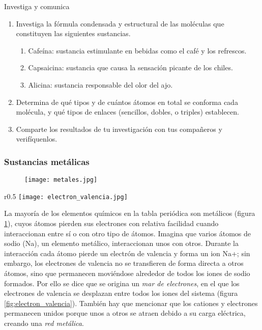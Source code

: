 \begin{minipage}{\textwidth}
    \begin{boxK}
        Investiga y comunica
        \begin{enumerate}
            \item Investiga la fórmula condensada y estructural de las moléculas que constituyen las siguientes sustancias.
                  \begin{enumerate}
                      \item Cafeína: sustancia estimulante en bebidas como el café y los refrescos.
                      \item Capsaicina: sustancia que causa la sensación picante de los chiles.
                      \item Alicina: sustancia responsable del olor del ajo.
                  \end{enumerate}
            \item Determina de qué tipos y de cuántos átomos en total se conforma cada molécula, y qué tipos de enlaces
                  (sencillos, dobles, o triples) establecen.
            \item Comparte los resultados de tu investigación con tus compañeros y verifíquenlos.
        \end{enumerate}
    \end{boxK}
\end{minipage}

\subsubsection{Sustancias metálicas}

\begin{figure}[H]
    \centering
    \texttt{[image: metales.jpg]}
    \label{fig:metales}
\end{figure}

\begin{wrapfigure}{r}{0.5\textwidth}
    \centering
    \texttt{[image: electron\_valencia.jpg]}
    \label{fig:electron_valencia}
\end{wrapfigure}

La mayoría de los elementos químicos en la tabla periódica son metálicos
(figura \ref{fig:metales}), cuyos átomos pierden sus electrones con relativa facilidad cuando interaccionan
entre sí o con otro tipo de átomos. Imagina que varios átomos de sodio (Na), un elemento metálico, interaccionan
unos con otros. Durante la interacción cada átomo pierde un electrón de valencia y forma un ion Na+; sin embargo,
los electrones de valencia no se transfieren de forma directa a otros átomos, sino que permanecen moviéndose alrededor
de todos los iones de sodio formados. Por ello se dice que se origina un \emph{mar de electrones}, en el
que los electrones de valencia se desplazan entre todos los iones del sistema (figura \ref{fig:electron_valencia}).
También hay que mencionar que los cationes y electrones permanecen unidos porque unos a otros se atraen debido a
su carga eléctrica, creando una \emph{red metálica}.


